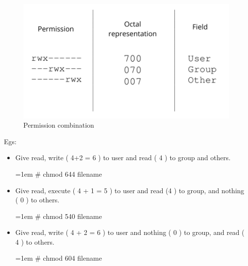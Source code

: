 \begin{flushleft}
\begin{figure}[h!]
	\centering
	\includegraphics[scale=0.4]{content/chapter5/images/perm5.png}
	\caption{Permission combination}
	\label{fig:combination_permission2}
\end{figure}


\newpage
Egs:
	\begin{itemize}
		\item 	Give read, write ( 4+2 = 6 ) to user and read ( 4 ) to group and others.
		\begin{tcolorbox}[breakable,notitle,boxrule=-0pt,colback=black,colframe=black]
			\color{green}
			\font=1em
			\# chmod 644 filename
			\font=4pt
		\end{tcolorbox}
		\bigskip
		
		\item Give read, execute ( 4 + 1 = 5 ) to user and read (4 ) to group, and nothing ( 0 ) to others.
		\bigskip
		\begin{tcolorbox}[breakable,notitle,boxrule=-0pt,colback=black,colframe=black]
			\color{green}
			\font=1em
			\# chmod 540 filename
			\font=4pt
		\end{tcolorbox}

	\bigskip
	\item Give read, write ( 4 + 2 = 6 ) to user and nothing ( 0 ) to group, and read ( 4 ) to others.
	\bigskip
	\begin{tcolorbox}[breakable,notitle,boxrule=-0pt,colback=black,colframe=black]
		\color{green}
		\font=1em
		\# chmod 604 filename
		\font=4pt
	\end{tcolorbox}
	\end{itemize}

	\newpage

\end{flushleft}
